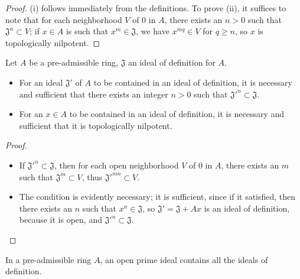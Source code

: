 \begin{proof}
\label{proof-lem-0.7.1.3}
(i) follows immediately from the definitions. To prove (ii), it suffices to note that for
each neighborhood $V$ of $0$ in $A$, there exists an $n>0$ such that
$\mathfrak{J}^n\subset V$; if $x\in A$ is such that $x^m\in\mathfrak{J}$, we have
$x^{mq}\in V$ for $q\geqslant n$, so $x$ is topologically nilpotent.
\end{proof}

\begin{prop}[7.1.4]
\label{prop-0.7.1.4}
Let $A$ be a pre-admissible ring, $\mathfrak{J}$ an ideal of definition for $A$.
\begin{itemize}
  \item[{\rm(i)}] For an ideal $\mathfrak{J}'$ of $A$ to be contained in an ideal of
    definition, it is necessary and sufficient that there exists an integer
    $n>0$ such that ${\mathfrak{J}'}^n\subset\mathfrak{J}$.
  \item[{\rm(ii)}] For an $x\in A$ to be contained in an ideal of definition, it is
    necessary and sufficient that it is topologically nilpotent.
\end{itemize}
\end{prop}

\begin{proof}
\label{proof-prop-0.7.1.4}
\medskip\noindent
\begin{itemize}
  \item[(i)] If ${\mathfrak{J}'}^n\subset\mathfrak{J}$, then for each open neighborhood
    $V$ of $0$ in $A$, there exists an $m$ such that $\mathfrak{J}^m\subset V$, thus
    ${\mathfrak{J}'}^{mn}\subset V$.
  \item[(ii)] The condition is evidently necessary; it is sufficient, since if it
    satisfied, then there exists an $n$ such that $x^n\in\mathfrak{J}$, so
    $\mathfrak{J}'=\mathfrak{J}+Ax$ is an ideal of definition, because it is
    open, and ${\mathfrak{J}'}^n\subset\mathfrak{J}$.
\end{itemize}
\end{proof}

\begin{cor}[7.1.5]
\label{cor-0.7.1.5}
In a pre-admissible ring $A$, an open prime ideal contains all the ideals of definition.
\end{cor}

